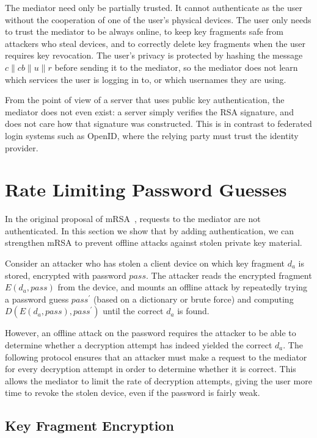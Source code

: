 \documentclass{llncs}
\newcommand*{\concat}{\mathbin{\|}}
\begin{document}
The mediator need only be partially trusted. It cannot authenticate as the user without the
cooperation of one of the user's physical devices. The user only needs to trust the mediator to be
always online, to keep key fragments safe from attackers who steal devices, and to correctly delete
key fragments when the user requires key revocation. The user's privacy is protected by hashing the
message $c \concat \mathit{cb} \concat u \concat r$ before sending it to the mediator, so the
mediator does not learn which services the user is logging in to, or which usernames they are using.

From the point of view of a server that uses public key authentication, the mediator does not even
exist: a server simply verifies the RSA signature, and does not care how that signature was
constructed. This is in contrast to federated login systems such as OpenID, where the relying party
must trust the identity provider.

\section{Rate Limiting Password Guesses}\label{sec:ratelimit}

In the original proposal of mRSA~\cite{Boneh01}, requests to the mediator are not authenticated. In
this section we show that by adding authentication, we can strengthen mRSA to prevent offline
attacks against stolen private key material.

Consider an attacker who has stolen a client device on which key fragment $d_a$ is stored, encrypted
with password $\mathit{pass}$. The attacker reads the encrypted fragment $E(d_a, \mathit{pass})$
from the device, and mounts an offline attack by repeatedly trying a password guess
$\mathit{pass}^\prime$ (based on a dictionary or brute force) and computing
$D(E(d_a, \mathit{pass}), \mathit{pass}^\prime)$ until the correct $d_a$ is found.

However, an offline attack on the password requires the attacker to be able to determine whether a
decryption attempt has indeed yielded the correct $d_a$. The following protocol ensures that an
attacker must make a request to the mediator for every decryption attempt in order to determine
whether it is correct. This allows the mediator to limit the rate of decryption attempts, giving the
user more time to revoke the stolen device, even if the password is fairly weak.

\subsection{Key Fragment Encryption}\label{sec:fragment-encryption}
\end{document}
